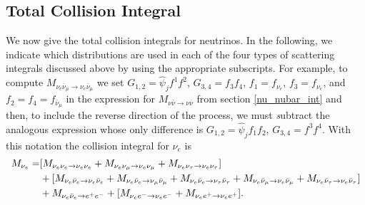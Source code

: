 \subsection{Total Collision Integral}
We now give the total collision integrals for neutrinos.    In the following, we indicate which distributions are used in each of the four types of scattering integrals discussed above by using the appropriate subscripts. For example, to compute $M_{\nu_e\bar\nu_\mu\rightarrow\nu_e\bar\nu_\mu}$  we set $G_{1,2}=\hat\psi_jf^1f^2$, $G_{3,4}=f_3f_4$, $f_1= f_{\nu_e}$, $f_3=f_{\nu_e}$, and $f_2=f_4=f_{\bar\nu_\mu}$ in the expression for $M_{\nu\bar\nu\rightarrow\nu\bar\nu}$ from section \ref{nu_nubar_int} and then, to include the reverse direction of the process, we must {\emph subtract}  the analogous expression whose only difference is $G_{1,2}=\hat\psi_jf_1f_2$, $G_{3,4}=f^3f^4$.
With this notation the collision integral for $\nu_e$ is
\begin{align}\label{M_tot}
M_{\nu_e}=&[M_{\nu_e\nu_e\rightarrow\nu_e\nu_e}+M_{\nu_e\nu_\mu\rightarrow\nu_e\nu_\mu}+M_{\nu_e\nu_\tau\rightarrow\nu_e\nu_\tau}]\\
&+[M_{\nu_e\bar\nu_e\rightarrow\nu_e\bar\nu_e}+M_{\nu_e\bar\nu_e\rightarrow\nu_\mu\bar\nu_\mu}+M_{\nu_e\bar\nu_e\rightarrow\nu_\tau\bar\nu_\tau}+M_{\nu_e\bar\nu_\mu\rightarrow\nu_e\bar\nu_\mu}+M_{\nu_e\bar\nu_\tau\rightarrow\nu_e\bar\nu_\tau}]\notag\\
&+M_{\nu_e\bar\nu_e\rightarrow e^+e^-}+[M_{\nu_e e^-\rightarrow\nu_e e^-}+M_{\nu_e e^+\rightarrow\nu_e e^+}].
\end{align}


